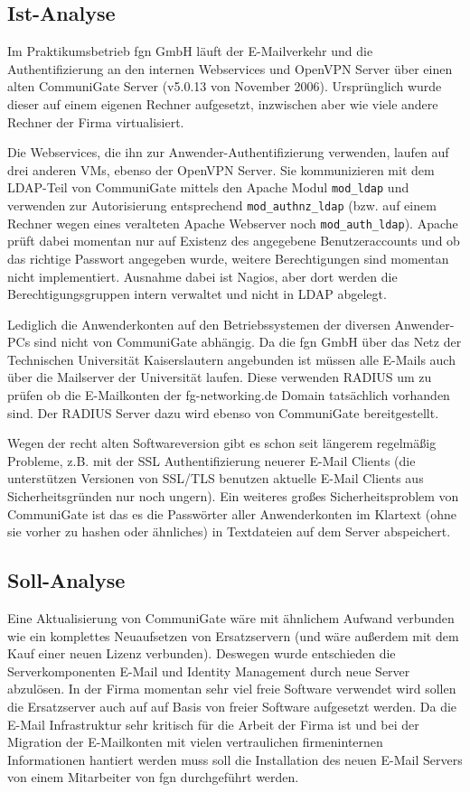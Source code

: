 \documentclass[11pt,a4paper,titlepage=firstiscover]{scrartcl} %
\begin{document}
\subsection{Ist-Analyse}
Im Praktikumsbetrieb fgn GmbH läuft der E-Mailverkehr und die Authentifizierung an den internen Webservices und OpenVPN Server über einen alten CommuniGate Server (v5.0.13 von November 2006). Ursprünglich wurde dieser auf einem eigenen Rechner aufgesetzt, inzwischen aber wie viele andere Rechner der Firma virtualisiert. 

Die Webservices, die ihn zur Anwender-Authentifizierung verwenden, laufen auf drei anderen VMs, ebenso der OpenVPN Server. Sie kommunizieren mit dem LDAP-Teil von CommuniGate mittels den Apache Modul \texttt{mod\_ldap} und verwenden zur Autorisierung entsprechend \texttt{mod\_authnz\_ldap} (bzw. auf einem Rechner wegen eines veralteten Apache Webserver noch \texttt{mod\_auth\_ldap}). Apache prüft dabei momentan nur auf Existenz des angegebene Benutzeraccounts und ob das richtige Passwort angegeben wurde, weitere Berechtigungen sind momentan nicht implementiert. Ausnahme dabei ist Nagios, aber dort werden die Berechtigungsgruppen intern verwaltet und nicht in LDAP abgelegt.

Lediglich die Anwenderkonten auf den Betriebssystemen der diversen Anwender-PCs sind nicht von CommuniGate abhängig. Da die fgn GmbH über das Netz der Technischen Universität Kaiserslautern angebunden ist müssen alle E-Mails auch über die Mailserver der Universität laufen. Diese verwenden RADIUS um zu prüfen ob die E-Mailkonten der fg-networking.de Domain tatsächlich vorhanden sind. Der RADIUS Server dazu wird ebenso von CommuniGate bereitgestellt. 

Wegen der recht alten Softwareversion gibt es schon seit längerem regelmäßig Probleme, z.B. mit der SSL Authentifizierung neuerer E-Mail Clients (die unterstützen Versionen von SSL/TLS benutzen aktuelle E-Mail Clients aus Sicherheitsgründen nur noch ungern). Ein weiteres großes Sicherheitsproblem von CommuniGate ist das es die Passwörter aller Anwenderkonten im Klartext (ohne sie vorher zu hashen oder ähnliches) in Textdateien auf dem Server abspeichert.

\subsection{Soll-Analyse}
Eine Aktualisierung von CommuniGate wäre mit ähnlichem Aufwand verbunden wie ein komplettes Neuaufsetzen von Ersatzservern (und wäre außerdem mit dem Kauf einer neuen Lizenz verbunden). Deswegen wurde entschieden die Serverkomponenten E-Mail und Identity Management durch neue Server abzulösen. In der Firma momentan sehr viel freie Software verwendet wird sollen die Ersatzserver auch auf auf Basis von freier Software aufgesetzt werden. Da die E-Mail Infrastruktur sehr kritisch für die Arbeit der Firma ist und bei der Migration der E-Mailkonten mit vielen vertraulichen firmeninternen Informationen hantiert werden muss soll die Installation des neuen E-Mail Servers von einem Mitarbeiter von fgn durchgeführt werden.
\end{document}

